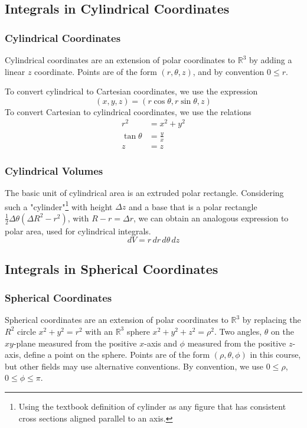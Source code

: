 \documentclass{article}
\begin{document}
\subsection{Integrals in Cylindrical Coordinates}
\subsubsection{Cylindrical Coordinates}
Cylindrical coordinates are an extension of polar coordinates to $\mathbb{R}^3$ by adding a linear $z$ coordinate. Points are of the form $(r,\theta,z)$, and by convention $0\le{r}$.

To convert cylindrical to Cartesian coordinates, we use the expression
$$(x,y,z)=(r\cos\theta,r\sin\theta,z)$$
To convert Cartesian to cylindrical coordinates, we use the relations
\begin{align*}
    r^2&=x^2+y^2\\
    \tan\theta&=\frac{y}{x}\\
    z&=z
\end{align*}

\subsubsection{Cylindrical Volumes}
The basic unit of cylindrical area is an extruded polar rectangle.
Considering such a "cylinder"\footnote{Using the textbook definition of cylinder as any figure that has consistent cross sections aligned parallel to an axis.} with height $\Delta z$ and a base that is a polar rectangle $\frac{1}{2}\Delta\theta(\Delta R^2-r^2)$, with $R-r = \Delta{r}$, we can obtain an analogous expression to polar area, used for cylindrical integrals.
$$dV=r\,dr\,d\theta\,dz$$

\subsection{Integrals in Spherical Coordinates}
\subsubsection{Spherical Coordinates}
Spherical coordinates are an extension of polar coordinates to $\mathbb{R}^3$ by replacing the $R^2$ circle $x^2+y^2=r^2$ with an $\mathbb{R}^3$ sphere $x^2+y^2+z^2=\rho^2$. Two angles, $\theta$ on the $xy$-plane measured from the positive $x$-axis and $\phi$ measured from the positive $z$-axis, define a point on the sphere. Points are of the form $(\rho,\theta,\phi)$ in this course, but other fields may use alternative conventions. By convention, we use $0\le\rho$, $0\le\phi\le\pi$.
\end{document}
